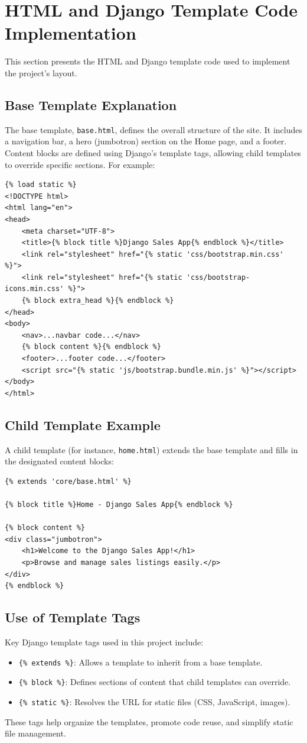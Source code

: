 \documentclass[12pt]{article}
\begin{document}
\section{HTML and Django Template Code Implementation}
This section presents the HTML and Django template code used to implement the project's layout.

\subsection{Base Template Explanation}
The base template, \texttt{base.html}, defines the overall structure of the site. It includes a navigation bar, a hero (jumbotron) section on the Home page, and a footer. Content blocks are defined using Django's template tags, allowing child templates to override specific sections. For example:

\begin{verbatim}
{% load static %}
<!DOCTYPE html>
<html lang="en">
<head>
    <meta charset="UTF-8">
    <title>{% block title %}Django Sales App{% endblock %}</title>
    <link rel="stylesheet" href="{% static 'css/bootstrap.min.css' %}">
    <link rel="stylesheet" href="{% static 'css/bootstrap-icons.min.css' %}">
    {% block extra_head %}{% endblock %}
</head>
<body>
    <nav>...navbar code...</nav>
    {% block content %}{% endblock %}
    <footer>...footer code...</footer>
    <script src="{% static 'js/bootstrap.bundle.min.js' %}"></script>
</body>
</html>
\end{verbatim}

\subsection{Child Template Example}
A child template (for instance, \texttt{home.html}) extends the base template and fills in the designated content blocks:

\begin{verbatim}
{% extends 'core/base.html' %}

{% block title %}Home - Django Sales App{% endblock %}

{% block content %}
<div class="jumbotron">
    <h1>Welcome to the Django Sales App!</h1>
    <p>Browse and manage sales listings easily.</p>
</div>
{% endblock %}
\end{verbatim}

\subsection{Use of Template Tags}
Key Django template tags used in this project include:
\begin{itemize}
    \item \verb|{% extends %}|: Allows a template to inherit from a base template.
    \item \verb|{% block %}|: Defines sections of content that child templates can override.
    \item \verb|{% static %}|: Resolves the URL for static files (CSS, JavaScript, images).
\end{itemize}
These tags help organize the templates, promote code reuse, and simplify static file management.
\end{document}
